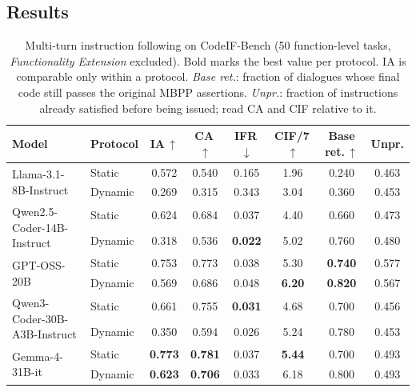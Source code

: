 \subsection{Results}
\label{app:multiturn-if-results}

\begin{table}[t]
\centering
\small
\begin{tabular}{llcccccc}
\toprule
\textbf{Model} & \textbf{Protocol} & \textbf{IA}\,$\uparrow$ & \textbf{CA}\,$\uparrow$ & \textbf{IFR}\,$\downarrow$ & \textbf{CIF}/7\,$\uparrow$ & \textbf{Base ret.}\,$\uparrow$ & \textbf{Unpr.} \\
\midrule
\multirow{2}{*}{Llama-3.1-8B-Instruct}
  & Static  & 0.572 & 0.540 & 0.165 & 1.96 & 0.240 & 0.463 \\
  & Dynamic & 0.269 & 0.315 & 0.343 & 3.04 & 0.360 & 0.453 \\
\midrule
\multirow{2}{*}{Qwen2.5-Coder-14B-Instruct}
  & Static  & 0.624 & 0.684 & 0.037 & 4.40 & 0.660 & 0.473 \\
  & Dynamic & 0.318 & 0.536 & \textbf{0.022} & 5.02 & 0.760 & 0.480 \\
\midrule
\multirow{2}{*}{GPT-OSS-20B}
  & Static  & 0.753 & 0.773 & 0.038 & 5.30 & \textbf{0.740} & 0.577 \\
  & Dynamic & 0.569 & 0.686 & 0.048 & \textbf{6.20} & \textbf{0.820} & 0.567 \\
\midrule
\multirow{2}{*}{Qwen3-Coder-30B-A3B-Instruct}
  & Static  & 0.661 & 0.755 & \textbf{0.031} & 4.68 & 0.700 & 0.456 \\
  & Dynamic & 0.350 & 0.594 & 0.026 & 5.24 & 0.780 & 0.453 \\
\midrule
\multirow{2}{*}{Gemma-4-31B-it}
  & Static  & \textbf{0.773} & \textbf{0.781} & 0.037 & \textbf{5.44} & 0.700 & 0.493 \\
  & Dynamic & \textbf{0.623} & \textbf{0.706} & 0.033 & 6.18 & 0.800 & 0.493 \\
\bottomrule
\end{tabular}
\caption{Multi-turn instruction following on CodeIF-Bench (50 function-level
tasks, \emph{Functionality Extension} excluded). Bold marks the best value per
protocol. IA is comparable only within a protocol. \emph{Base ret.}: fraction
of dialogues whose final code still passes the original MBPP assertions.
\emph{Unpr.}: fraction of instructions already satisfied before being issued;
read CA and CIF relative to it.}
\label{tab:mtif-main}
\end{table}

